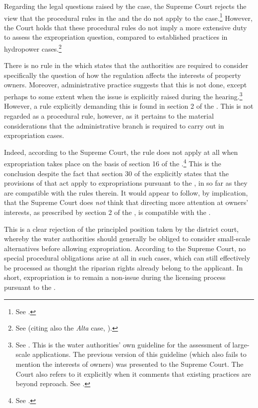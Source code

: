 Regarding the legal questions raised by the case, the Supreme Court rejects the view that the procedural rules in the \cite{ea59} and the \cite{paa67} do not apply to the case.\footnote{See \cite[32-34]{jorpeland11}.} However, the Court holds that these procedural rules do not imply a more extensive duty to assess the expropriation question, compared to established practices in hydropower cases.\footnote{See \cite[51-52]{jorpeland11} (citing also the {\it Alta} case, \cite{alta82}).} 

There is no rule in the \cite{wra17} which states that the authorities are required to consider specifically the question of how the regulation affects the interests of property owners. Moreover, administrative practice suggests that this is not done, except perhaps to some extent when the issue is explicitly raised during the hearing.\footnote{See \cite{stokker10}. This is the water authorities' own guideline for the assessment of large-scale applications. The previous version of this guideline (which also fails to mention the interests of owners) was presented to the Supreme Court. The Court also refers to it explicitly when it comments that existing practices are beyond reproach. See \cite[51]{jorpeland11}.} However, a rule explicitly demanding this is found in section 2 of the \cite{ea59}. This is not regarded as a procedural rule, however, as it pertains to the material considerations that the administrative branch is required to carry out in expropriation cases. 

Indeed, according to the Supreme Court, the rule does not apply at all when expropriation takes place on the basis of section 16 of the \cite{wra17}.\footnote{See \cite[30]{jorpeland11}.} This is the conclusion despite the fact that section 30 of the \cite{ea59} explicitly states that the provisions of that act apply to expropriations pursuant to the \cite{wra17}, in so far as they are compatible with the rules therein. It would appear to follow, by implication, that the Supreme Court does {\it not} think that directing more attention at owners' interests, as prescribed by section 2 of the \cite{ea59}, is compatible with the \cite{wra17}. 

This is a clear rejection of the principled position taken by the district court, whereby the water authorities should generally be obliged to consider small-scale alternatives before allowing expropriation. According to the Supreme Court, no special procedural obligations arise at all in such cases, which can still effectively be processed as thought the riparian rights already belong to the applicant. In short, expropriation is to remain a non-issue during the licensing process pursuant to the \cite{wra17}. 

